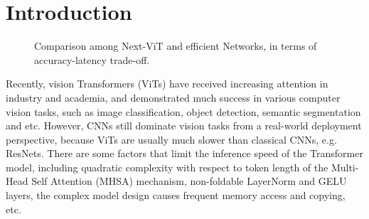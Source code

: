 \documentclass[10pt,twocolumn,letterpaper]{article}
\begin{document}
\section{Introduction}

\begin{figure*} [t]
\centering
{}
\hspace{0.1mm}
\hspace{0.1mm}
\hfil
{}
\hspace{0.1mm}
\hspace{0.1mm}

\caption{Comparison among Next-ViT and efficient Networks, in terms of accuracy-latency trade-off.}
\label{fig:accuracy}
\end{figure*}

Recently, vision Transformers (ViTs) have received increasing attention in industry and academia, and demonstrated much success in various computer vision tasks, such as image classification, object detection, semantic segmentation and etc. However, CNNs still dominate vision tasks from a real-world deployment perspective, because ViTs are usually much slower than classical CNNs, e.g. ResNets. There are some factors that limit the inference speed of the Transformer model, including quadratic complexity with respect to token length of the Multi-Head Self Attention (MHSA) mechanism, non-foldable LayerNorm and GELU layers, the complex model design causes frequent memory access and copying, etc.
\end{document}
